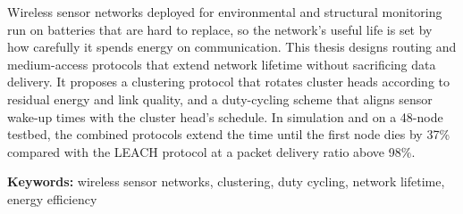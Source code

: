 Wireless sensor networks deployed for environmental and structural monitoring run on batteries
that are hard to replace, so the network's useful life is set by how carefully it spends
energy on communication. This thesis designs routing and medium-access protocols that extend
network lifetime without sacrificing data delivery. It proposes a clustering protocol that
rotates cluster heads according to residual energy and link quality, and a duty-cycling scheme
that aligns sensor wake-up times with the cluster head's schedule. In simulation and on a
48-node testbed, the combined protocols extend the time until the first node dies by 37\%
compared with the LEACH protocol at a packet delivery ratio above 98\%.

\medskip\noindent\textbf{Keywords:} wireless sensor networks, clustering, duty cycling, network
lifetime, energy efficiency
